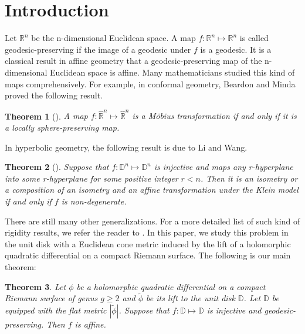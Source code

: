 \documentclass{amsart}
\theoremstyle{plain}
\newtheorem{Theorem}{Theorem}
\theoremstyle{definition}
\theoremstyle{remark}
\begin{document}
\section{Introduction}
% 
\noindent Let $\mathbb{R}^n$ be the n-dimensional Euclidean space.  A map $f: \mathbb{R}^n \mapsto \mathbb{R}^n$ is called geodesic-preserving if the image of a geodesic under $f$ is a geodesic.  It is a classical result in affine geometry that a geodesic-preserving map of the n-dimensional Euclidean space is affine.  Many mathematicians studied this kind of maps comprehensively.  For example, in conformal geometry, Beardon and Minda proved the following result.
\begin{Theorem}[\cite{BeardonMinda2002sphere}]
    A map $f : \hat{\mathbb{R}}^n \mapsto\hat{\mathbb{R}}^n $ is a M\"{o}bius transformation if and only if it is a locally sphere-preserving map.  
\end{Theorem}
% 
In hyperbolic geometry, the following result is due to Li and Wang.  
\begin{Theorem}[\cite{LiWangFundamental2016}]
    Suppose that $f : \mathbb{D}^n \mapsto \mathbb{D}^n $ is injective and maps any r-hyperplane into some r-hyperplane for some positive integer $r<n$.  Then it is an isometry or a composition of an isometry and an affine transformation under the Klein model if and only if $f$ is non-degenerate.  
\end{Theorem}
There are still many other generalizations.  For a more detailed list of such kind of rigidity results, we refer the reader to \cite{LiWangFundamental2016}.  In this paper, we study this problem in the unit disk with a Euclidean cone metric induced by the lift of a holomorphic quadratic differential on a compact Riemann surface.  The following is our main theorem:
\begin{Theorem} \label{main_theorem}
    Let $\phi$ be a holomorphic quadratic differential on a compact Riemann surface of genus $g \ge 2$ and $\tilde{\phi}$ be its lift to the unit disk $\mathbb{D}$.  Let $\mathbb{D}$ be equipped with the flat metric $|\tilde{\phi}|$.  Suppose that $f:\mathbb{D} \mapsto \mathbb{D}$ is injective and geodesic-preserving. Then $f$ is affine.  
\end{Theorem}
% 
% 
% 
\end{document}
